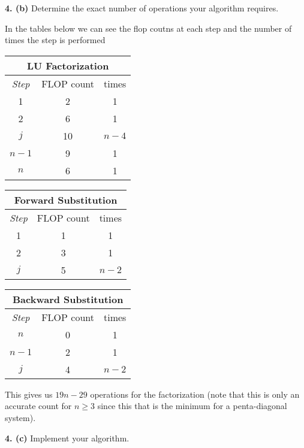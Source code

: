 \documentclass[12pt]{article}
\newcommand{\problem}[1]{\hspace{-4 ex} \large \textbf{#1}}
\begin{document}
\problem{4. (b)} Determine the exact number of operations your algorithm requires.

	In the tables below we can see the flop coutns at each step and the number of times the step is performed
	\begin{center}
		\begin{tabular}{|c|c|c|}\hline
			\multicolumn{3}{|c|}{LU Factorization} \\ \hline
			\emph{Step}&FLOP count&times \\ \hline
			1 &2 & 1 \\ \hline
			2 &6 & 1 \\ \hline
			$j$ & 10 & $n-4$ \\ \hline
			$n-1$ & 9 & 1 \\ \hline
			$n$ & 6 & 1 \\ \hline
		\end{tabular}
	\end{center}
	\begin{center}
		\begin{tabular}{|c|c|c|}\hline
			\multicolumn{3}{|c|}{Forward Substitution} \\ \hline
			\emph{Step}&FLOP count&times \\ \hline
			1 &1 & 1 \\ \hline
			2 &3 & 1 \\ \hline
			$j$ & 5 & $n-2$ \\ \hline
		\end{tabular}
	\end{center}
	\begin{center}
		\begin{tabular}{|c|c|c|}\hline
			\multicolumn{3}{|c|}{Backward Substitution} \\ \hline
			\emph{Step}&FLOP count&times \\ \hline
			$n$ &0 & 1 \\ \hline
			$n-1$ &2 & 1 \\ \hline
			$j$ & 4 & $n-2$ \\ \hline
		\end{tabular}
	\end{center}
	This gives us $19n-29$ operations for the factorization (note that this is only an accurate count for $n \geq 3$ since this that is the minimum for a penta-diagonal system).
	
\problem{4. (c)} Implement your algorithm. \\
\end{document}
